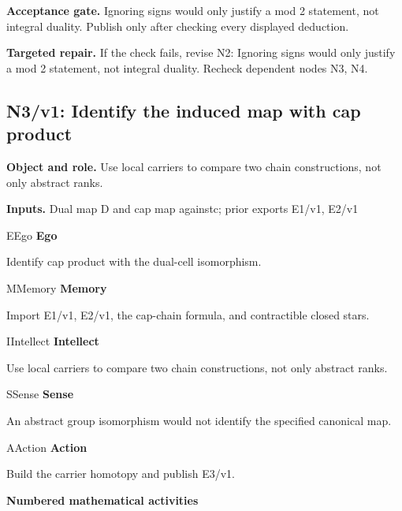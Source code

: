 \documentclass[preprint,12pt,aps,pra,showkeys,amsmath,amssymb,superscriptaddress,floatfix]{revtex4-2}
\theoremstyle{definition}
\theoremstyle{remark}
\newcommand{\mmfaculty}[3]{%
 \begin{mmfacultybox}{#1}{#2}
 {\sffamily\bfseries\color{MMBlue}#2}\par\smallskip #3
 \end{mmfacultybox}}
\newcommand{\field}[2]{\par\smallskip\noindent\textbf{#1.} #2\par}
\begin{document}
\field{Acceptance gate}{Ignoring signs would only justify a mod 2 statement, not integral
duality. Publish only after checking every displayed deduction.}

\field{Targeted repair}{If the check fails, revise N2: Ignoring signs would only justify a mod 2
statement, not integral duality. Recheck dependent nodes N3, N4.}

\clearpage

\begingroup\footnotesize\linespread{1.05}\selectfont\let\small\footnotesize

\subsection{N3/v1: Identify the induced map with cap product}

\field{Object and role}{Use local carriers to compare two chain constructions, not only abstract
ranks.}

\field{Inputs}{Dual map D and cap map againstc; prior exports E1/v1, E2/v1}

\mmfaculty{E}{Ego}{Identify cap product with the dual-cell isomorphism.}

\mmfaculty{M}{Memory}{Import E1/v1, E2/v1, the cap-chain formula, and contractible closed
stars.}

\mmfaculty{I}{Intellect}{Use local carriers to compare two chain constructions, not only abstract
ranks.}

\mmfaculty{S}{Sense}{An abstract group isomorphism would not identify the specified canonical
map.}

\mmfaculty{A}{Action}{Build the carrier homotopy and publish E3/v1.}

\smallskip\noindent\textbf{Numbered mathematical activities}
\end{document}
